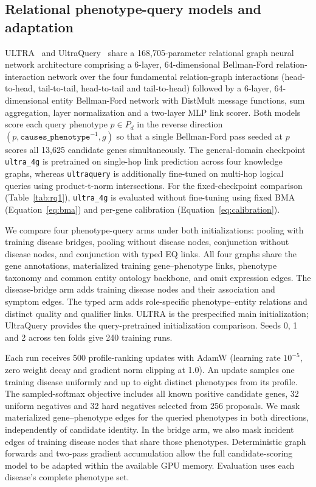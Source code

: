 \documentclass[webpdf,contemporary,large]{oup-authoring-template}%
\theoremstyle{thmstyleone}%
\theoremstyle{thmstyletwo}%
\theoremstyle{thmstylethree}%
\renewcommand{\cite}{\citep}
\begin{document}
\subsection{Relational phenotype-query models and adaptation}

ULTRA~\cite{ultra} and UltraQuery~\cite{galkin2024ultraquery} share a
168{,}705-parameter relational graph neural network architecture comprising a
6-layer, 64-dimensional Bellman-Ford relation-interaction network over the four
fundamental relation-graph interactions (head-to-head, tail-to-tail,
head-to-tail and tail-to-head) followed by a 6-layer, 64-dimensional entity
Bellman-Ford network with DistMult message functions, sum aggregation, layer
normalization and a two-layer MLP link scorer. Both models score each query
phenotype $p \in P_d$ in the reverse direction
$(p, \texttt{causes\_phenotype}^{-1}, g)$ so that a single Bellman-Ford pass
seeded at $p$ scores all 13{,}625 candidate genes simultaneously. The
general-domain checkpoint \texttt{ultra\_4g} is pretrained on single-hop link
prediction across four knowledge graphs, whereas \texttt{ultraquery} is
additionally fine-tuned on multi-hop logical queries using product-t-norm
intersections. For the fixed-checkpoint comparison (Table~\ref{tab:rq1}),
\texttt{ultra\_4g} is evaluated without fine-tuning using fixed BMA
(Equation~\ref{eq:bma}) and per-gene calibration (Equation~\ref{eq:calibration}).

We compare four phenotype-query arms under both initializations: pooling with
training disease bridges, pooling without disease nodes, conjunction without
disease nodes, and conjunction with typed EQ links. All four graphs share the
gene annotations, materialized training gene--phenotype links, phenotype taxonomy
and common entity ontology backbone, and omit expression edges. The disease-bridge
arm adds training disease nodes and their association and symptom edges. The
typed arm adds role-specific phenotype--entity relations and distinct quality
and qualifier links. ULTRA is the prespecified main initialization; UltraQuery
provides the query-pretrained initialization comparison. Seeds 0, 1 and 2 across
ten folds give 240 training runs.

Each run receives 500 profile-ranking updates with AdamW (learning rate
$10^{-5}$, zero weight decay and gradient norm clipping at 1.0). An update
samples one training disease uniformly and up to eight distinct phenotypes
from its profile. The sampled-softmax objective includes all known positive
candidate genes, 32 uniform negatives and 32 hard negatives selected from 256
proposals. We mask materialized gene--phenotype edges for the queried phenotypes
in both directions, independently of candidate identity. In the bridge arm,
we also mask incident edges of training disease nodes that share those
phenotypes. Deterministic graph forwards and two-pass gradient accumulation
allow the full candidate-scoring model to be adapted within the available GPU
memory. Evaluation uses each disease's complete phenotype set.
\end{document}
